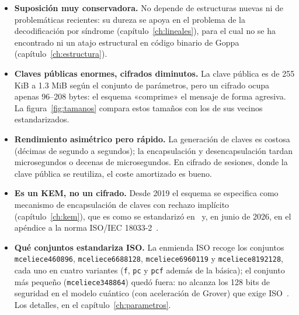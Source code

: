 \documentclass[11pt,a4paper,oneside]{report}
\begin{document}
\begin{itemize}[leftmargin=1.4em,itemsep=2pt]
  \item \textbf{Suposición muy conservadora.} No depende de estructuras
        nuevas ni de problemáticas recientes: su dureza se apoya en el
        problema de la decodificación por síndrome (capítulo~\ref{ch:lineales}),
        para el cual no se ha encontrado ni un atajo estructural en
        código binario de Goppa (capítulo~\ref{ch:estructura}).
  \item \textbf{Claves públicas enormes, cifrados diminutos.} La clave
        pública es de 255 KiB a 1.3 MiB según el conjunto de parámetros,
        pero un cifrado ocupa apenas 96--208 bytes: el esquema «comprime»
        el mensaje de forma agresiva. La figura~\ref{fig:tamanos} compara
        estos tamaños con los de sus vecinos estandarizados.
  \item \textbf{Rendimiento asimétrico pero rápido.} La generación de
        claves es costosa (décimas de segundo a segundos); la
        encapsulación y desencapsulación tardan microsegundos o decenas de
        microsegundos. En cifrado de sesiones, donde la clave pública se
        reutiliza, el coste amortizado es bueno.
  \item \textbf{Es un KEM, no un cifrado.} Desde 2019 el esquema se
        especifica como mecanismo de encapsulación de claves con rechazo
        implícito (capítulo~\ref{ch:kem}), que es como se estandarizó
        en~\cite{cmspec} y, en junio de 2026, en el apéndice a la norma
        ISO/IEC 18033-2~\cite{iso18033,cmiso}.
  \item \textbf{Qué conjuntos estandariza ISO.} La enmienda ISO recoge los
        conjuntos \texttt{mceliece460896}, \texttt{mceliece6688128},
        \texttt{mceliece6960119} y \texttt{mceliece8192128}, cada uno en
        cuatro variantes (\texttt{f}, \texttt{pc} y \texttt{pcf} además de
        la básica); el conjunto más pequeño (\texttt{mceliece348864})
        quedó fuera: no alcanza los 128 bits de seguridad en el modelo
        cuántico (con aceleración de Grover) que exige
        ISO~\cite{cmiso}. Los detalles, en el capítulo~\ref{ch:parametros}.
\end{itemize}
\end{document}
